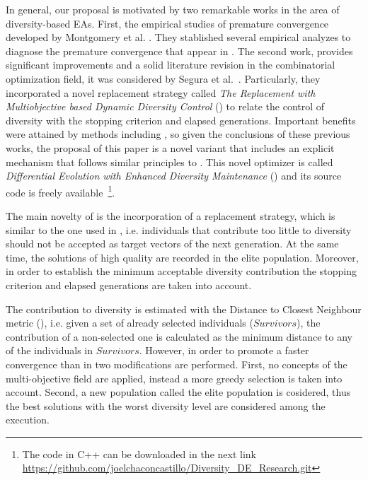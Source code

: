 In general, our proposal is motivated by two remarkable works in the area of diversity-based EAs.
%
First, the empirical studies of premature convergence developed by Montgomery et al. \cite{montgomery2012simple}.
%
They stablished several empirical analyzes to diagnose the premature convergence that appear in \DE{}.
%
The second work, provides significant improvements and a solid literature revision in the combinatorial optimization field, it was considered by Segura et al.~\cite{segura2016novel}.
%
Particularly, they incorporated a novel replacement strategy called \textit{The Replacement with Multiobjective based Dynamic Diversity Control} (\RMDDC{}) to relate the control of diversity with the stopping criterion and elapsed generations.
%
Important benefits were attained by methods including \RMDDC{}, so given the conclusions of these previous works, the proposal of this paper is a 
novel \DE{} variant that includes an explicit mechanism that follows similar principles to \RMDDC{}.
%
This novel optimizer is called \textit{Differential Evolution with Enhanced Diversity Maintenance} (\DEEDM{}) and its source
code is freely available~\footnote{The code in C++ can be downloaded in the next link \url{https://github.com/joelchaconcastillo/Diversity\_DE\_Research.git}}.

The main novelty of \DEEDM{} is the incorporation of a replacement strategy, which is similar to the one used in \RMDDC{}, i.e.
individuals that contribute too little to diversity should not be accepted as target vectors of the next generation.
%
At the same time, the solutions of high quality are recorded in the elite population.
%
Moreover, in order to establish the minimum acceptable diversity contribution the stopping criterion and elapsed
generations are taken into account.

The contribution to diversity is estimated with the Distance to Closest Neighbour metric (\DCN{}), i.e. given
a set of already selected individuals ($Survivors$), the contribution of a non-selected one is calculated as the minimum
distance to any of the individuals in $Survivors$.
%
However, in order to promote a faster convergence than in \RMDDC{} two modifications are performed.
%
First, no concepts of the multi-objective field are applied, instead a more greedy selection is taken into account.
%
Second, a new population called the elite population is cosidered, thus the best solutions with the worst diversity level are considered among the execution.

